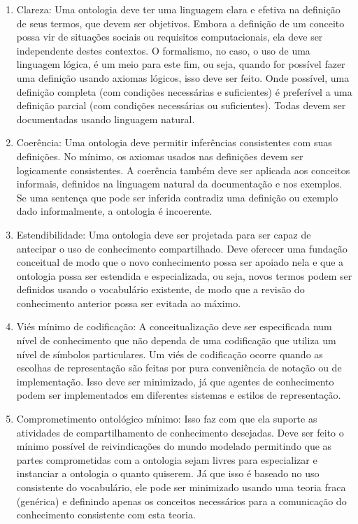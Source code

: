 \begin{enumerate}
	\item Clareza: Uma ontologia deve ter uma linguagem clara e efetiva na definição de seus termos, que devem ser objetivos. Embora a definição de um conceito possa vir de situações sociais ou requisitos computacionais, ela deve ser independente destes contextos. O formalismo, no caso, o uso de uma linguagem lógica, é um meio para este fim, ou seja, quando for possível fazer uma definição usando axiomas lógicos, isso deve ser feito. Onde possível, uma definição completa (com condições necessárias e suficientes) é preferível a uma definição parcial (com condições necessárias ou suficientes). Todas devem ser documentadas usando linguagem natural.
	\item Coerência: Uma ontologia deve permitir inferências consistentes com suas definições. No mínimo, os axiomas usados nas definições devem ser logicamente consistentes. A coerência também deve ser aplicada aos conceitos informais, definidos na linguagem natural da documentação e nos exemplos. Se uma sentença que pode ser inferida contradiz uma definição ou exemplo dado informalmente, a ontologia é incoerente.
	\item Estendibilidade: Uma ontologia deve ser projetada para ser capaz de antecipar o uso de conhecimento compartilhado. Deve oferecer uma fundação conceitual de modo que o novo conhecimento possa ser apoiado nela e que a ontologia possa ser estendida e especializada, ou seja, novos termos podem ser definidos usando o vocabulário existente, de modo que a revisão do conhecimento anterior possa ser evitada ao máximo.
	\item Viés mínimo de codificação: A conceitualização deve ser especificada num nível de conhecimento que não dependa de uma codificação que utiliza um nível de símbolos particulares. Um viés de codificação ocorre quando as escolhas de representação são feitas por pura conveniência de notação ou de implementação. Isso deve ser minimizado, já que agentes de conhecimento podem ser implementados em diferentes sistemas e estilos de representação.
	\item Comprometimento ontológico mínimo: Isso faz com que ela suporte as atividades de compartilhamento de conhecimento desejadas. Deve ser feito o mínimo possível de reivindicações do mundo modelado permitindo que as partes comprometidas com a ontologia sejam livres para especializar e instanciar a ontologia o quanto quiserem. Já que isso é baseado no uso consistente do vocabulário, ele pode ser minimizado usando uma teoria fraca (genérica) e definindo apenas os conceitos necessários para a comunicação do conhecimento consistente com esta teoria.
\end{enumerate}

